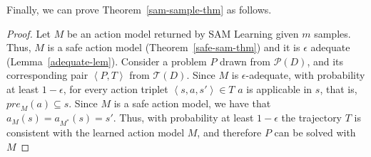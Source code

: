 \documentclass{article}
\newtheorem{lemma}{Lemma}
\newcommand{\tuple}[1]{\ensuremath{\left \langle #1 \right \rangle }}
\newcommand{\pre}{\textit{pre}}
\newcommand{\realm}{\ensuremath{M^*}\xspace}
\begin{document}



\noindent Finally, we can prove Theorem~\ref{sam-sample-thm} as follows. 
\begin{proof}
Let $M$ be an action model returned by SAM Learning given $m$ samples. 
Thus, $M$ is a safe action model (Theorem~\ref{safe-sam-thm}) and it is $\epsilon$ adequate (Lemma~\ref{adequate-lem}). 
Consider a problem $P$ drawn from $\mathcal{P}(D)$, 
and its corresponding pair $\tuple{P, T}$ from $\mathcal{T}(D)$. 
Since $M$ is $\epsilon$-adequate, with probability at least $1-\epsilon$, 
for every action triplet $\tuple{s,a,s'}\in T$ 
$a$ is applicable in $s$, that is, $\pre_M(a)\subseteq s$. 
Since $M$ is a safe action model, we have that $a_M(s)=a_{\realm}(s)=s'$. 
Thus, with probability at least $1-\epsilon$ the trajectory $T$ is consistent with the learned action model $M$, and therefore $P$ can be solved with $M$ %
\end{proof}
\end{document}
